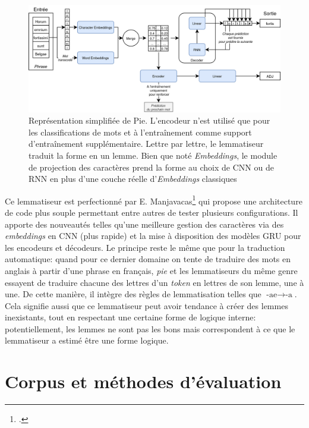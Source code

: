 \begin{figure}[h]
    \centering
    \includegraphics[width=\linewidth]{results/lemmatisation/outils/Pie.png}
    \caption{Représentation simplifiée de Pie. L'encodeur n'est utilisé que pour les classifications de mots et à l'entraînement comme support d'entraînement supplémentaire. Lettre par lettre, le lemmatiseur traduit la forme en un lemme. Bien que noté \textit{Embeddings}, le module de projection des caractères prend la forme au choix de CNN ou de RNN en plus d'une couche réelle d'\textit{Embeddings} classiques}
    \label{lemmatisation:outils:pie}
\end{figure}

Ce lemmatiseur est perfectionné par E. Manjavacas\footcite{manjavacas_improving_2019} qui propose une architecture de code plus souple permettant entre autres de tester plusieurs configurations. Il apporte des nouveautés telles qu'une meilleure gestion des caractères via des \textit{embeddings} en CNN (plus rapide) et la mise à disposition des modèles GRU pour les encodeurs et décodeurs. Le principe reste le même que pour la traduction automatique: quand pour ce dernier domaine on tente de traduire des mots en anglais à partir d'une phrase en français, \textit{pie} et les lemmatiseurs du même genre essayent de traduire chacune des lettres d'un \textit{token} en lettres de son lemme, une à une. De cette manière, il intègre des règles de lemmatisation telles que \textit{$\textrm{-ae} \rightarrow \textrm{-a}$}. Cela signifie aussi que ce lemmatiseur peut avoir tendance à créer des lemmes inexistants, tout en respectant une certaine forme de logique interne: potentiellement, les lemmes ne sont pas les bons mais correspondent à ce que le lemmatiseur a estimé être une forme logique. %

\section{Corpus et méthodes d'évaluation}
\label{subsec:lemma_corpus}

